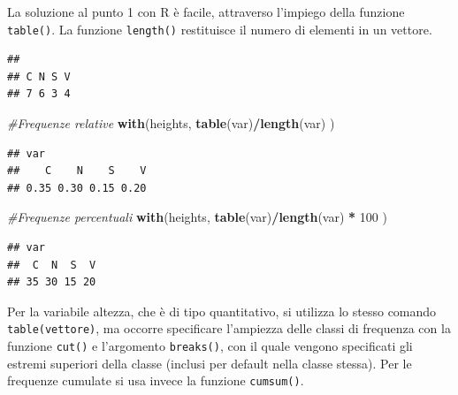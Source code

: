 \documentclass[a4paper,12pt,oneside]{book}
\newenvironment{Shaded}{\begin{snugshade}}{\end{snugshade}}
\newcommand{\KeywordTok}[1]{\textcolor[rgb]{0.13,0.29,0.53}{\textbf{#1}}}
\newcommand{\DataTypeTok}[1]{\textcolor[rgb]{0.13,0.29,0.53}{#1}}
\newcommand{\DecValTok}[1]{\textcolor[rgb]{0.00,0.00,0.81}{#1}}
\newcommand{\StringTok}[1]{\textcolor[rgb]{0.31,0.60,0.02}{#1}}
\newcommand{\CommentTok}[1]{\textcolor[rgb]{0.56,0.35,0.01}{\textit{#1}}}
\newcommand{\OperatorTok}[1]{\textcolor[rgb]{0.81,0.36,0.00}{\textbf{#1}}}
\newcommand{\NormalTok}[1]{#1}
\begin{document}
La soluzione al punto 1 con R è facile, attraverso l'impiego della
funzione \texttt{table()}. La funzione \texttt{length()} restituisce il
numero di elementi in un vettore.

\begin{Shaded}
\end{Shaded}

\begin{verbatim}
## 
## C N S V 
## 7 6 3 4
\end{verbatim}

\begin{Shaded}
\begin{Highlighting}[]
\CommentTok{#Frequenze relative}
\KeywordTok{with}\NormalTok{(heights, }\KeywordTok{table}\NormalTok{(var)}\OperatorTok{/}\KeywordTok{length}\NormalTok{(var) ) }
\end{Highlighting}
\end{Shaded}

\begin{verbatim}
## var
##    C    N    S    V 
## 0.35 0.30 0.15 0.20
\end{verbatim}

\begin{Shaded}
\begin{Highlighting}[]
\CommentTok{#Frequenze percentuali}
\KeywordTok{with}\NormalTok{(heights, }\KeywordTok{table}\NormalTok{(var)}\OperatorTok{/}\KeywordTok{length}\NormalTok{(var) }\OperatorTok{*}\StringTok{ }\DecValTok{100}\NormalTok{ )}
\end{Highlighting}
\end{Shaded}

\begin{verbatim}
## var
##  C  N  S  V 
## 35 30 15 20
\end{verbatim}

Per la variabile altezza, che è di tipo quantitativo, si utilizza lo
stesso comando \texttt{table(vettore)}, ma occorre specificare
l'ampiezza delle classi di frequenza con la funzione \texttt{cut()} e
l'argomento \texttt{breaks()}, con il quale vengono specificati gli
estremi superiori della classe (inclusi per default nella classe
stessa). Per le frequenze cumulate si usa invece la funzione
\texttt{cumsum()}.

\begin{Shaded}
\end{Shaded}
\end{document}
